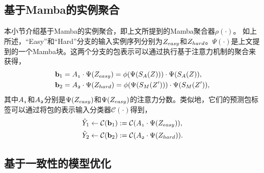 \subsection[\hspace{-2pt}基于Mamba的实例聚合]{{\heiti{} \hspace{-8pt}基于Mamba的实例聚合}}\label{section4: 基于Mamba的实例聚合}
本小节介绍基于Mamba的实例聚合，即上文所提到的Mamba聚合器$\rho\left(\cdot\right)$。
如上所述，“Easy”和“Hard”分支的输入实例序列分别为$\mathnormal{Z_{easy}}$和$\mathnormal{Z_{hard}}$。$\Psi(\cdot)$是上文提到的一个Mamba块。这两个分支的包表示可以通过执行基于注意力机制的聚合来获得，
\begin{equation}
  \begin{aligned}
      &\mathbf{b}_1=\mathnormal{A_1} \cdot \Psi(\mathnormal{Z_{easy}})=\phi(\Psi(S_A(Z)))\cdot \Psi(S_A(Z)), \\
      &\mathbf{b}_2=\mathnormal{A_2} \cdot \Psi(\mathnormal{Z_{hard}})=\phi(\Psi(S_M(Z')))\cdot \Psi(S_M(Z')),
  \end{aligned}
  \label{eq6}
\end{equation}
其中$\mathnormal{A_1}$和$\mathnormal{A_2}$分别是$ \Psi(\mathnormal{Z_{easy}})$和$ \Psi(\mathnormal{Z_{easy}})$的注意力分数。类似地，它们的预测包标签可以通过将包的表示输入分类器$\mathcal{C}(\cdot)$得到，
\begin{equation}
  \begin{aligned}
      &\hat{Y}_1\leftarrow \mathcal{C}(\mathbf{b}_1):=\mathcal{C}(\mathnormal{A_1}\cdot \Psi(\mathnormal{Z_{easy}})),\\
      &\hat{Y}_2\leftarrow \mathcal{C}(\mathbf{b}_2):=\mathcal{C}(\mathnormal{A_2} \cdot \Psi(\mathnormal{Z_{hard}})).
  \end{aligned}
  \label{eq7}
  \end{equation} 

\subsection[\hspace{-2pt}基于一致性的模型优化]{{\heiti{} \hspace{-8pt}基于一致性的模型优化}}\label{section4: 基于一致性的模型优化}


